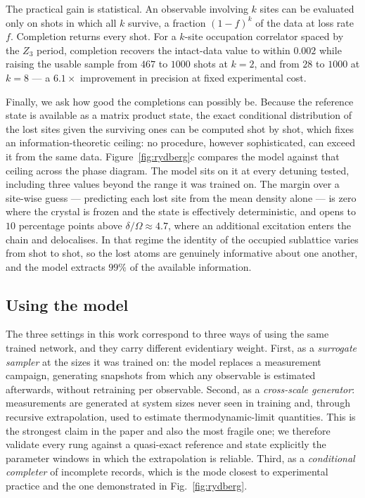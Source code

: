 The practical gain is statistical. An observable involving $k$ sites can be
evaluated only on shots in which all $k$ survive, a fraction $(1-f)^k$ of the
data at loss rate $f$. Completion returns every shot. For a $k$-site
occupation correlator spaced by the $Z_3$ period, completion recovers the
intact-data value to within $0.002$ while raising the usable sample from
$467$ to $1000$ shots at $k=2$, and from $28$ to $1000$ at $k=8$ --- a
$6.1\times$ improvement in precision at fixed experimental cost.

Finally, we ask how good the completions can possibly be.
Because the reference state is available as a matrix product state, the exact
conditional distribution of the lost sites given the surviving ones can be
computed shot by shot, which fixes an information-theoretic ceiling: no
procedure, however sophisticated, can exceed it from the same data.
Figure~\ref{fig:rydberg}c compares the model against that ceiling across the
phase diagram. The model sits on it at every detuning tested, including three
values beyond the range it was trained on. The margin over a site-wise guess
--- predicting each lost site from the mean density alone --- is zero where
the crystal is frozen and the state is effectively deterministic, and opens
to $10$ percentage points above $\delta/\Omega \approx 4.7$, where an
additional excitation enters the chain and delocalises. In that regime the
identity of the occupied sublattice varies from shot to shot, so the lost
atoms are genuinely informative about one another, and the model extracts
$99\%$ of the available information.


\subsection*{Using the model}

The three settings in this work correspond to three ways of using the same
trained network, and they carry different evidentiary weight. First, as a
\emph{surrogate sampler} at the sizes it was trained on: the model replaces a
measurement campaign, generating snapshots from which any observable is
estimated afterwards, without retraining per observable. Second, as a
\emph{cross-scale generator}: measurements are generated at system sizes
never seen in training and, through recursive extrapolation, used to estimate
thermodynamic-limit quantities. This is the strongest claim in the paper and
also the most fragile one; we therefore validate every rung against a
quasi-exact reference and state explicitly the parameter windows in which the
extrapolation is reliable. Third, as a \emph{conditional completer} of
incomplete records, which is the mode closest to experimental practice and
the one demonstrated in Fig.~\ref{fig:rydberg}.

